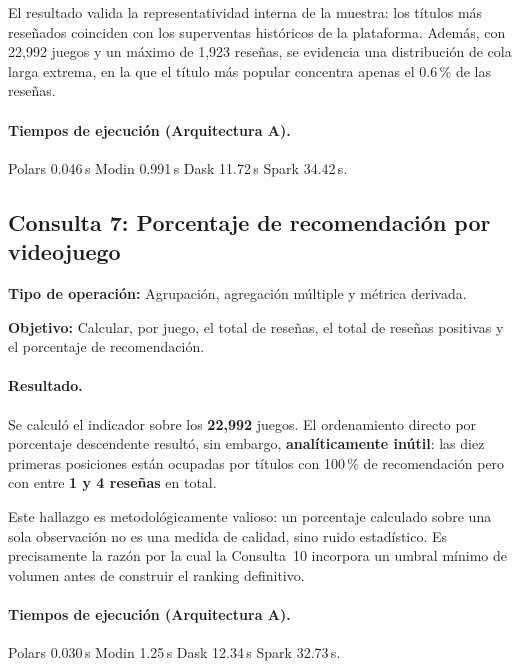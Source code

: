 El resultado valida la representatividad interna de la muestra: los títulos más reseñados coinciden con los superventas históricos de la plataforma. Además, con 22,992 juegos y un máximo de 1,923 reseñas, se evidencia una distribución de cola larga extrema, en la que el título más popular concentra apenas el 0.6\,\% de las reseñas.

\paragraph{Tiempos de ejecución (Arquitectura A).}
Polars 0.046\,s \textbar{} Modin 0.991\,s \textbar{} Dask 11.72\,s \textbar{} Spark 34.42\,s.



\subsection{Consulta 7: Porcentaje de recomendación por videojuego}

\textbf{Tipo de operación:} Agrupación, agregación múltiple y métrica derivada.

\textbf{Objetivo:} Calcular, por juego, el total de reseñas, el total de reseñas positivas y el porcentaje de recomendación.


\paragraph{Resultado.}
Se calculó el indicador sobre los \textbf{22,992} juegos. El ordenamiento directo por porcentaje descendente resultó, sin embargo, \textbf{analíticamente inútil}: las diez primeras posiciones están ocupadas por títulos con 100\,\% de recomendación pero con entre \textbf{1 y 4 reseñas} en total.

Este hallazgo es metodológicamente valioso: un porcentaje calculado sobre una sola observación no es una medida de calidad, sino ruido estadístico. Es precisamente la razón por la cual la Consulta~10 incorpora un umbral mínimo de volumen antes de construir el ranking definitivo.

\paragraph{Tiempos de ejecución (Arquitectura A).}
Polars 0.030\,s \textbar{} Modin 1.25\,s \textbar{} Dask 12.34\,s \textbar{} Spark 32.73\,s.

